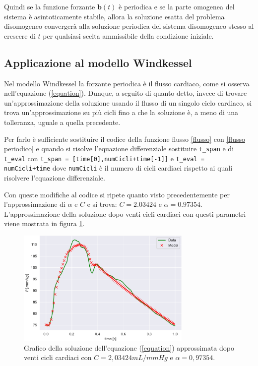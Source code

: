 Quindi se la funzione forzante $\bm{b}(t)$ è periodica e se la parte omogenea del sistema è asintoticamente stabile, allora la soluzione esatta del problema disomogeneo convergerà alla soluzione periodica del sistema disomogeneo stesso al crescere di $t$ per qualsiasi scelta ammissibile della condizione iniziale.

\subsection{Applicazione al modello Windkessel}
Nel modello Windkessel la forzante periodica è il flusso cardiaco, come si osserva nell'equazione (\ref{equation}). Dunque, a seguito di quanto detto, invece di trovare un'approssimazione della soluzione usando il flusso di un singolo ciclo cardiaco, si trova un'approssimazione su più cicli fino a che la soluzione è, a meno di una tolleranza, uguale a quella precedente.

Per farlo è sufficiente sostituire il codice della funzione flusso \ref{flusso} con \ref{flusso periodico} e quando si risolve l'equazione differenziale sostituire \verb|t_span| e di \verb|t_eval| con \verb|t_span = [time[0],numCicli+time[-1]]| e \verb|t_eval = numCicli+time| dove \verb|numCicli| è il numero di cicli cardiaci rispetto ai quali risolvere l'equazione differenziale. 

\newpage

Con queste modifiche al codice si ripete quanto visto precedentemente per l'approssimazione di $\alpha$ e $C$ e si trova: $C=2.03424$ e $\alpha= 0.97354$. L'approssimazione della soluzione dopo venti cicli cardiaci con questi parametri viene mostrata in figura \ref{soluzionePeriodicaCalphaapprossimata}.


\begin{figure}[h]
    \centering
    \includegraphics[width=0.75\textwidth]{images/Windkessel/modelloPeriodicoCalphastimata.pdf}
    \caption{Grafico della soluzione dell'equazione (\ref{equation}) approssimata dopo venti cicli cardiaci  con $C=2,03424mL/mmHg$ e $\alpha=0,97354$.}
    \label{soluzionePeriodicaCalphaapprossimata}
\end{figure}

